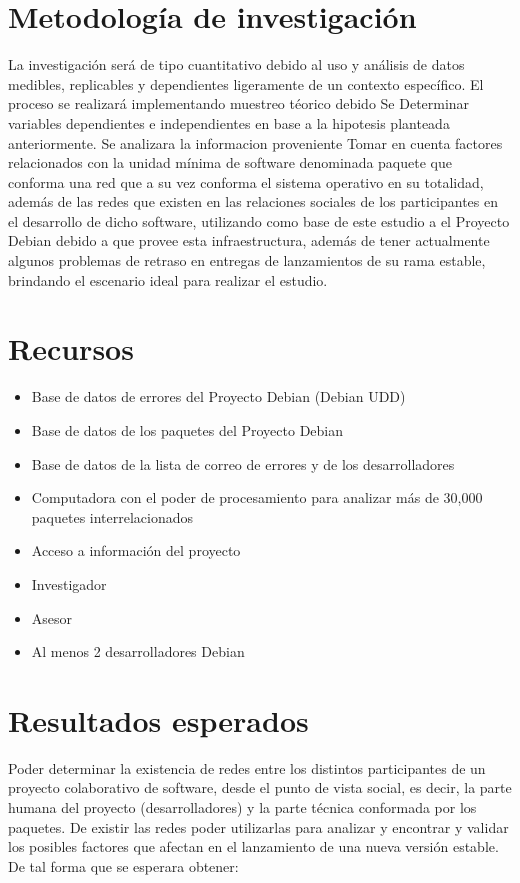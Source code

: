 \documentclass[letterpaper,12pt,titlepage]{report}
\begin{document}
\chapter{Metodología de investigación} %
La investigación será de tipo cuantitativo debido al uso y análisis
de datos medibles, replicables y dependientes ligeramente de un contexto
específico. El proceso se realizará implementando muestreo téorico 
debido  Se Determinar variables dependientes e independientes en base a la hipotesis
planteada anteriormente. Se analizara la informacion proveniente 
Tomar en cuenta factores relacionados con la unidad mínima de software
denominada paquete que conforma una red que a su vez conforma el
sistema operativo en su totalidad, además de las redes que existen en
las relaciones sociales de los participantes en el desarrollo de dicho
software, utilizando como base de este estudio a el Proyecto Debian
debido a que provee esta infraestructura, además de tener actualmente
algunos problemas de retraso en entregas de lanzamientos de su rama
estable, brindando el escenario ideal para realizar el estudio.

\chapter{Recursos}
\begin{itemize}
\item Base de datos de errores del Proyecto Debian (Debian UDD)
\item Base de datos de los paquetes del Proyecto Debian
\item Base de datos de la lista de correo de errores y de los
  desarrolladores
\item Computadora con el poder de procesamiento para analizar más de
  30,000 paquetes interrelacionados
\item Acceso a información del proyecto
\item Investigador
\item Asesor
\item Al menos 2 desarrolladores Debian
\end{itemize}

\chapter{Resultados esperados}
Poder determinar la existencia de redes entre los distintos
participantes de un proyecto colaborativo de software, desde el punto
de vista social, es decir, la parte humana del proyecto
(desarrolladores) y la parte técnica conformada por los paquetes. De
existir las redes poder utilizarlas para analizar y encontrar y
validar los posibles factores que afectan en el lanzamiento de una
nueva versión estable. De tal forma que se esperara obtener:
\end{document}
